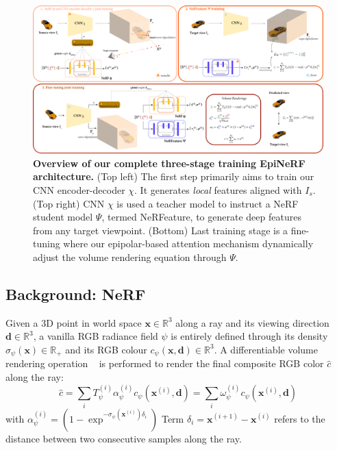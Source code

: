 \begin{figure}[htb!]
    \begin{center}
  \includegraphics[width=\linewidth]{images/epinerf/overview_architecture.png}
  \end{center}
  \caption{\textbf{Overview of our complete three-stage training EpiNeRF architecture.} (Top left) The first step primarily aims to train our CNN encoder-decoder $\chi$. It generates \textit{local} features aligned with $I_{s}$. (Top right) CNN $\chi$ is used a teacher model to instruct a NeRF student model $\Psi$, termed NeRFeature, to generate deep features from any target viewpoint. (Bottom) Last training stage is a fine-tuning where our epipolar-based attention mechanism dynamically adjust the volume rendering equation through $\Psi$.}
  \label{fig:overview}
\end{figure}

\subsection{Background: NeRF}

Given a 3D point in world space $\mathbf{x} \in \mathbb{R}^{3}$ along a ray and its viewing direction $\mathbf{d} \in \mathbb{R}^{3}$, a vanilla RGB radiance field $\psi$ is entirely defined through its density $\sigma_{\psi}(\mathbf{x})\in \mathbb{R}_{+}$  and its RGB colour $c_{\psi}(\mathbf{x},\mathbf{d}) \in \mathbb{R}^{3}$. 
A differentiable volume rendering operation ~\citep{max1995optical} is performed to render the final composite RGB color $\hat{c}$ along the ray: 
\begin{equation}
\hat{c}  = \sum_{i}T_{\psi}^{(i)}\alpha_{\psi}^{(i)}c_{\psi}(\mathbf{x}^{(i)},\mathbf{d}) = \sum_{i} \omega_{\psi}^{(i)}c_{\psi}(\mathbf{x}^{(i)},\mathbf{d})
\end{equation}
with $\alpha_{\psi}^{(i)} = (1-\exp^{-\sigma_{\psi}(\mathbf{x}^{(i)})\delta_{i}})$ Term $\delta_{i} = \mathbf{x}^{(i+1)} - \mathbf{x}^{(i)} $ refers to the distance between two consecutive samples along the ray.


